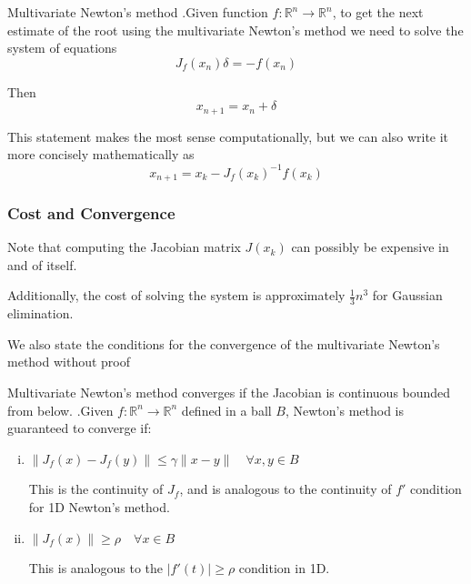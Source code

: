 \documentclass[12pt,letterpaper]{article}
\newcommand{\R}{\mathbb{R}}
\begin{document}
\begin{algo}{Multivariate Newton's method}
.Given function $f : \R^n \rightarrow \R^n$, to get the next estimate of the root using the multivariate Newton's method we need to solve the system of equations
\begin{equation}
J_f(x_n) \delta = -f(x_n)
\end{equation}

Then
\begin{equation}
	x_{n+1} = x_n + \delta
\end{equation}

This statement makes the most sense computationally, but we can also write it more concisely mathematically as
\begin{equation}
	x_{n+1} = x_k - J_f(x_k)^{-1} f(x_k)
\end{equation}
\end{algo}

\subsubsection{Cost and Convergence}
Note that computing the Jacobian matrix $J(x_k)$ can possibly be expensive in and of itself.

Additionally, the cost of solving the system is approximately $\frac{1}{3}n^3$ for Gaussian elimination.

We also state the conditions for the convergence of the multivariate Newton's method without proof

\begin{constr}{Multivariate Newton's method converges if the Jacobian is continuous bounded from below.}
.Given $f : \R^n \rightarrow \R^n$ defined in a ball $B$, Newton's method is guaranteed to converge if:

\begin{enumerate}[(i)]
	\item $\lVert J_f(x) - J_f(y) \rVert \leq \gamma \lVert x - y \rVert \quad \forall x, y \in B$
	
	\medskip
	This is the continuity of $J_f$, and is analogous to the continuity of $f'$ condition for 1D Newton's method.
	
	\medskip
	\item $\lVert J_f(x) \rVert \geq \rho \quad \forall x \in B$
	
	\medskip
	This is analogous to the $\lvert f'(t) \rvert \geq \rho$ condition in 1D.
\end{enumerate}
\end{constr}
\end{document}
